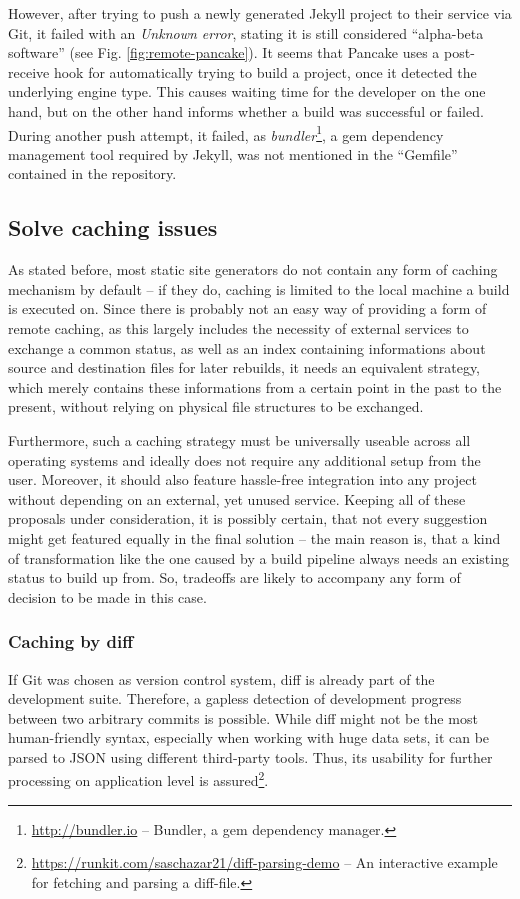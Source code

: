 However, after trying to push a newly generated Jekyll project to their service via Git, it failed with an \emph{Unknown error}, stating it is still considered ``alpha-beta software'' (see Fig. \ref{fig:remote-pancake}). It seems that Pancake uses a post-receive hook for automatically trying to build a project, once it detected the underlying engine type. This causes waiting time for the developer on the one hand, but on the other hand informs whether a build was successful or failed. During another push attempt, it failed, as \emph{bundler}\footnote{\url{http://bundler.io} -- Bundler, a gem dependency manager.}, a gem dependency management tool required by Jekyll, was not mentioned in the ``Gemfile'' contained in the repository.


\subsection{Solve caching issues}
\label{sec:solutions-caching}

As stated before, most static site generators do not contain any form of caching mechanism by default -- if they do, caching is limited to the local machine a build is executed on. Since there is probably not an easy way of providing a form of remote caching, as this largely includes the necessity of external services to exchange a common status, as well as an index containing informations about source and destination files for later rebuilds, it needs an equivalent strategy, which merely contains these informations from a certain point in the past to the present, without relying on physical file structures to be exchanged.

Furthermore, such a caching strategy must be universally useable across all operating systems and ideally does not require any additional setup from the user. Moreover, it should also feature hassle-free integration into any project without depending on an external, yet unused service. Keeping all of these proposals under consideration, it is possibly certain, that not every suggestion might get featured equally in the final solution -- the main reason is, that a kind of transformation like the one caused by a build pipeline always needs an existing status to build up from. So, tradeoffs are likely to accompany any form of decision to be made in this case.

\subsubsection{Caching by diff}
If Git was chosen as version control system, diff is already part of the development suite. Therefore, a gapless detection of development progress between two arbitrary commits is possible. While diff might not be the most human-friendly syntax, especially when working with huge data sets, it can be parsed to JSON using different third-party tools. Thus, its usability for further processing on application level is assured\footnote{\url{https://runkit.com/saschazar21/diff-parsing-demo} -- An interactive example for fetching and parsing a diff-file.}.
